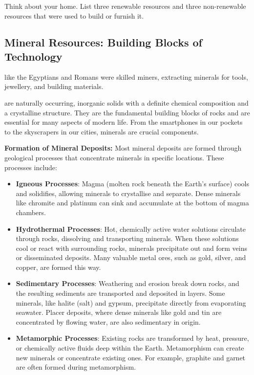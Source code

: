 \begin{stopandthink}
Think about your home. List three renewable resources and three non-renewable resources that were used to build or furnish it.
\end{stopandthink}

\subsection{Mineral Resources: Building Blocks of Technology}

\begin{marginnote}
 like the Egyptians and Romans were skilled miners, extracting minerals for tools, jewellery, and building materials.
\end{marginnote}

 are naturally occurring, inorganic solids with a definite chemical composition and a crystalline structure. They are the fundamental building blocks of rocks and are essential for many aspects of modern life. From the smartphones in our pockets to the skyscrapers in our cities, minerals are crucial components.

\textbf{Formation of Mineral Deposits:} Most mineral deposits are formed through geological processes that concentrate minerals in specific locations. These processes include:

\begin{itemize}
    \item \textbf{Igneous Processes}: Magma (molten rock beneath the Earth's surface) cools and solidifies, allowing minerals to crystallise and separate.  Dense minerals like chromite and platinum can sink and accumulate at the bottom of magma chambers.
    \item \textbf{Hydrothermal Processes}: Hot, chemically active water solutions circulate through rocks, dissolving and transporting minerals. When these solutions cool or react with surrounding rocks, minerals precipitate out and form veins or disseminated deposits. Many valuable metal ores, such as gold, silver, and copper, are formed this way.
    \item \textbf{Sedimentary Processes}: Weathering and erosion break down rocks, and the resulting sediments are transported and deposited in layers.  Some minerals, like halite (salt) and gypsum, precipitate directly from evaporating seawater.  Placer deposits, where dense minerals like gold and tin are concentrated by flowing water, are also sedimentary in origin.
    \item \textbf{Metamorphic Processes}:  Existing rocks are transformed by heat, pressure, or chemically active fluids deep within the Earth.  Metamorphism can create new minerals or concentrate existing ones. For example, graphite and garnet are often formed during metamorphism.
\end{itemize}

